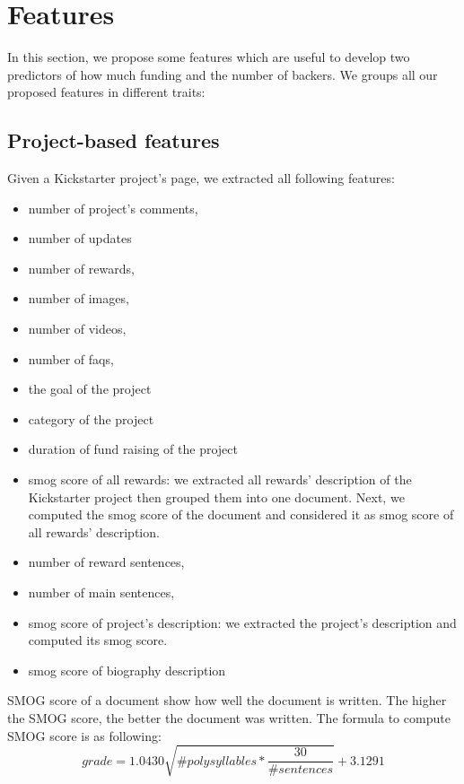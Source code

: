 
\section{Features}
In this section, we propose some features which are useful to develop two predictors of how much funding and the number of backers. We groups all our proposed features in different traits:
\subsection{Project-based features}
Given a Kickstarter project's page, we extracted all following features:
\begin{itemize}
	\item number of project's comments,
	\item number of updates
	\item number of rewards,
	\item number of images,
	\item number of videos,
	\item number of faqs,
	\item the goal of the project
	\item category of the project
	\item duration of fund raising of the project
	\item smog score of all rewards: we extracted all rewards' description of the Kickstarter project then grouped them into one document. Next, we computed the smog score of the document and considered it as smog score of all rewards' description.
	\item number of reward sentences,
	\item number of main sentences,
	\item smog score of project's description: we extracted the project's description and computed its smog score.
	\item smog score of biography description
\end{itemize}
SMOG score of a document show how well the document is written. The higher the SMOG score, the better the document was written. The formula to compute SMOG score is as following:
\[
	grade = 1.0430\sqrt{\#polysyllables * \frac{30}{\#sentences}} + 3.1291	
\]
